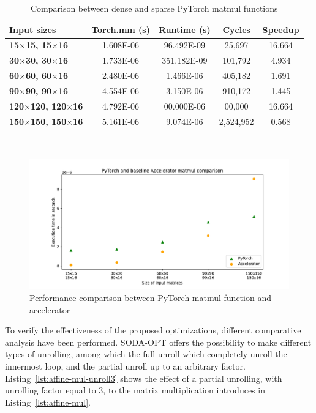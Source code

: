 \begin{table}[t]
\centering
    \begin{tabular}{|p{9em} c c c c  |}
    \hline
    \textbf{Input sizes} & \textbf{Torch.mm (s)} & \textbf{Runtime (s)} & \textbf{Cycles} & \textbf{Speedup} \T\B \\
    \hline \hline
    \textbf{15$\times$15, 15$\times$16} & 1.608E-06  & 96.492E-09 & 25,697 & 16.664 \T\B\\
    \hline
    \textbf{30$\times$30, 30$\times$16} & 1.733E-06  & 351.182E-09 & 101,792 & 4.934 \T\B\\
    \hline
    \textbf{60$\times$60, 60$\times$16} & 2.480E-06  & 1.466E-06 & 405,182 & 1.691 \T\B\\
    \hline
    \textbf{90$\times$90, 90$\times$16} & 4.554E-06  & 3.150E-06 & 910,172 & 1.445 \T\B\\
    \hline
    \textbf{120$\times$120, 120$\times$16} & 4.792E-06  & 00.000E-06 & 00,000 & 16.664 \T\B\\
    \hline
    \textbf{150$\times$150, 150$\times$16} & 5.161E-06  & 9.074E-06 & 2,524,952 & 0.568 \T\B\\
    \hline
    \end{tabular}
    \\[10pt]
    \caption{Comparison between dense and sparse PyTorch matmul functions}
    \label{tab:pytorch-accelerator-comparison}
\end{table}

\begin{figure}[t]
    \centering
    \includegraphics[height=0.4\textwidth]{Images/matmul_comparison}
    \caption{Performance comparison between PyTorch matmul function and accelerator}
    \label{fig:pytorch-accelerator-comparison}
\end{figure}

To verify the effectiveness of the proposed optimizations, different comparative analysis have been performed.
SODA-OPT offers the possibility to make different types of unrolling, among which the full unroll which completely unroll the innermost loop, and the partial unroll up to an arbitrary factor.
Listing~\ref{lst:affine-mul-unroll3} shows the effect of a partial unrolling, with unrolling factor equal to 3, to the matrix multiplication introduces in Listing~\ref{lst:affine-mul}.

